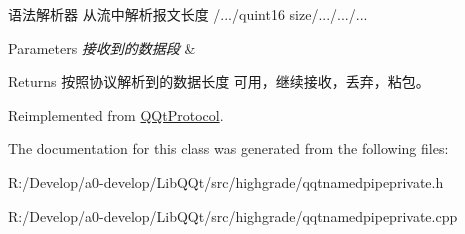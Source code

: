 语法解析器 从流中解析报文长度 /.../quint16 size/.../.../... 


\begin{DoxyParams}{Parameters}
{\em 接收到的数据段} & \\
\hline
\end{DoxyParams}
\begin{DoxyReturn}{Returns}
按照协议解析到的数据长度 可用，继续接收，丢弃，粘包。 
\end{DoxyReturn}


Reimplemented from \mbox{\hyperlink{class_q_qt_protocol_a00fd0c1ac23379ed3b9b25da9a34f39b}{Q\+Qt\+Protocol}}.



The documentation for this class was generated from the following files\+:\begin{DoxyCompactItemize}
\item 
R\+:/\+Develop/a0-\/develop/\+Lib\+Q\+Qt/src/highgrade/qqtnamedpipeprivate.\+h\item 
R\+:/\+Develop/a0-\/develop/\+Lib\+Q\+Qt/src/highgrade/qqtnamedpipeprivate.\+cpp\end{DoxyCompactItemize}
